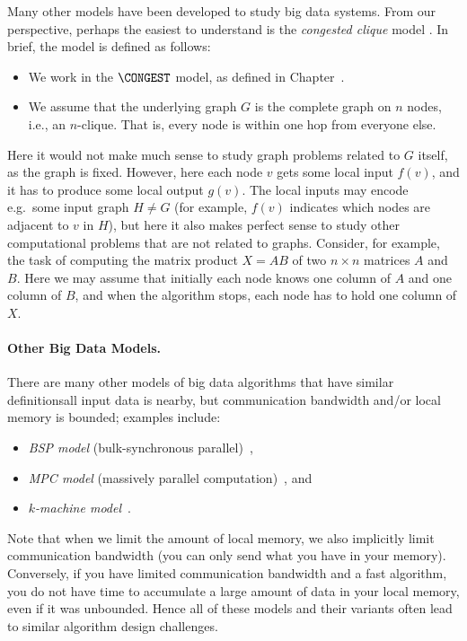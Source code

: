 Many other models have been developed to study big data systems. From our perspective, perhaps the easiest to understand is the \emph{congested clique} model \cite{Lotker2005,Lenzen2013,Dolev2012}. In brief, the model is defined as follows:
\begin{itemize}
  \item We work in the $\CONGEST$ model, as defined in Chapter~.
  \item We assume that the underlying graph $G$ is the complete graph on $n$ nodes, i.e., an $n$-clique. That is, every node is within one hop from everyone else.
\end{itemize}
Here it would not make much sense to study graph problems related to $G$ itself, as the graph is fixed. However, here each node $v$ gets some local input $f(v)$, and it has to produce some local output $g(v)$. The local inputs may encode e.g.\ some input graph $H \ne G$ (for example, $f(v)$ indicates which nodes are adjacent to $v$ in $H$), but here it also makes perfect sense to study other computational problems that are not related to graphs. Consider, for example, the task of computing the matrix product $X = AB$ of two $n \times n$ matrices $A$ and $B$. Here we may assume that initially each node knows one column of $A$ and one column of $B$, and when the algorithm stops, each node has to hold one column of $X$.

\paragraph{Other Big Data Models.}

There are many other models of big data algorithms that have similar definitions\mydash{}all input data is nearby, but communication bandwidth and/or local memory is bounded; examples include:
\begin{itemize}[noitemsep]
  \item \emph{BSP model} (bulk-synchronous parallel)~\cite{Valiant1990},
  \item \emph{MPC model} (massively parallel computation)~\cite{Karloff2010}, and
  \item \emph{$k$-machine model}~\cite{Klauck2015}.
\end{itemize}
Note that when we limit the amount of local memory, we also implicitly limit communication bandwidth (you can only send what you have in your memory). Conversely, if you have limited communication bandwidth and a fast algorithm, you do not have time to accumulate a large amount of data in your local memory, even if it was unbounded. Hence all of these models and their variants often lead to similar algorithm design challenges.


